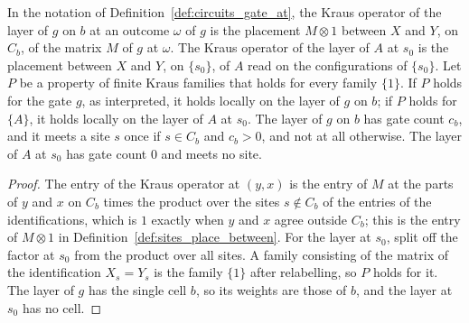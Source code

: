 \begin{lemma}
    \label{lem:circuits_gate_at}
    \leanok
    In the notation of Definition~\ref{def:circuits_gate_at}, the Kraus operator of the
    layer of $g$ on $b$ at an outcome $\omega$ of $g$ is the placement $M\otimes1$ between
    $X$ and $Y$, on $C_b$, of the matrix $M$ of $g$ at $\omega$. The Kraus operator of the
    layer of $A$ at $s_0$ is the placement between $X$ and $Y$, on $\{s_0\}$, of $A$ read
    on the configurations of $\{s_0\}$. Let $P$ be a property of finite Kraus families
    that holds for every family $\{1\}$. If $P$ holds for the gate $g$, as interpreted, it
    holds locally on the layer of $g$ on $b$; if $P$ holds for $\{A\}$, it holds locally on
    the layer of $A$ at $s_0$. The layer of $g$ on $b$ has gate count $c_b$, and it meets a
    site $s$ once if $s\in C_b$ and $c_b>0$, and not at all otherwise. The layer of $A$ at
    $s_0$ has gate count $0$ and meets no site.
\end{lemma}
\begin{proof}\leanok
    The entry of the Kraus operator at $(y,x)$ is the entry of $M$ at the parts of $y$ and
    $x$ on $C_b$ times the product over the sites $s\notin C_b$ of the entries of the
    identifications, which is $1$ exactly when $y$ and $x$ agree outside $C_b$; this is the
    entry of $M\otimes1$ in Definition~\ref{def:sites_place_between}. For the layer at
    $s_0$, split off the factor at $s_0$ from the product over all sites. A family
    consisting of the matrix of the identification $X_s=Y_s$ is the family $\{1\}$ after
    relabelling, so $P$ holds for it. The layer of $g$ has the single cell $b$, so its
    weights are those of $b$, and the layer at $s_0$ has no cell.
\end{proof}

